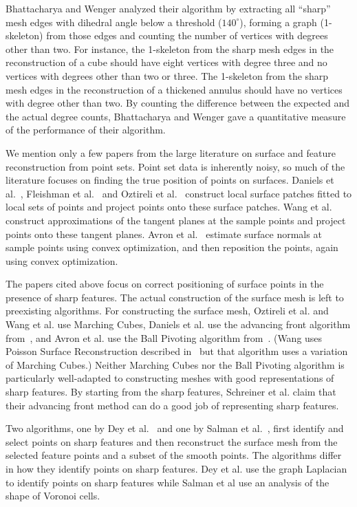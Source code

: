 Bhattacharya and Wenger analyzed their algorithm by extracting all 
``sharp'' mesh edges with dihedral angle below a threshold ($140^\circ$),
forming a graph (1-skeleton) from those edges
and counting the number of vertices with degrees other than two.
For instance, the 1-skeleton from the sharp mesh edges in the reconstruction
of a cube should have eight vertices with degree three
and no vertices with degrees other than two or three.
The 1-skeleton from the sharp mesh edges in the reconstruction
of a thickened annulus should have no vertices with degree other than two.
By counting the difference between the expected and the actual degree counts,
Bhattacharya and Wenger gave a quantitative measure of the performance
of their algorithm.

We mention only a few papers from the large literature
on surface and feature reconstruction from point sets.
Point set data is inherently noisy, so much of the literature
focuses on finding the true position of points on surfaces.
Daniels et al.~\cite{Daniels:2007:Robust},
Fleishman et al.~\cite{fcs-rmlsf-2005}
and Oztireli et al.~\cite{Oztireli2009}
construct local surface patches fitted to local sets of points
and project points onto these surface patches.
Wang et al.~\cite{Wang:2013:Feature}
construct approximations of the tangent planes at the sample points
and project points onto these tangent planes.
Avron et al.~\cite{avron2010L} estimate surface normals
at sample points using convex optimization,
and then reposition the points, again using convex optimization.

The papers cited above focus on correct positioning of surface points
in the presence of sharp features.
The actual construction of the surface mesh is
left to preexisting algorithms.
For constructing the surface mesh,
Oztireli et al. and Wang et al. use Marching Cubes,
Daniels et al. use the advancing front algorithm 
from~\cite{Schreiner:2006:Direct},
and Avron et al. use the Ball Pivoting algorithm 
from~\cite{Bernardini:1999:Ball}.
(Wang uses Poisson Surface Reconstruction described 
in~\cite{Kazhdan:2006:Poisson} but that algorithm
uses a variation of Marching Cubes.)
Neither Marching Cubes nor the Ball Pivoting algorithm
is particularly well-adapted to constructing meshes 
with good representations of sharp features.
By starting from the sharp features,
Schreiner et al. claim that their advancing front method
can do a good job of representing sharp features.

Two algorithms, one by Dey et al.~\cite{Dey2012} and 
one by Salman et al.~\cite{sym-fpmg-10},
first identify and select points on sharp features
and then reconstruct the surface mesh from the selected feature points
and a subset of the smooth points.
The algorithms differ in how they identify points on sharp features.
Dey et al. use the graph Laplacian to identify points on sharp features
while Salman et al use an analysis of the shape of Voronoi cells.

